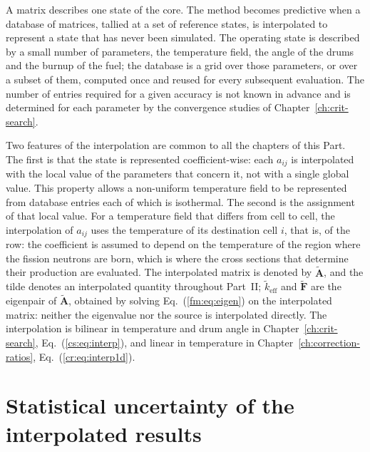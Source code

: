 A matrix describes one state of the core. The method becomes predictive when a
database of matrices, tallied at a set of reference states, is interpolated to
represent a state that has never been simulated. The operating state is described by
a small number of parameters, the temperature field, the angle of the drums and
the burnup of the fuel; the database is a grid over
those parameters, or over a subset of them, computed once and reused for every subsequent evaluation. The number of entries required for a given accuracy is not known in advance
and is determined for each parameter by the convergence studies of
Chapter~\ref{ch:crit-search}.

Two features of the interpolation are common to all the chapters of this Part. The first is that the state is represented coefficient-wise:
each $a_{ij}$ is interpolated with the local value of the parameters that
concern it, not with a single global value. This property allows a non-uniform temperature field to be represented from
database entries each of which is isothermal. The second is the assignment of that local value. For a
temperature field that differs from cell to cell, the interpolation of
$a_{ij}$ uses the temperature of its destination cell $i$, that is, of the
row: the coefficient is assumed to depend on the temperature of the region
where the fission neutrons are born, which is where the cross sections that
determine their production are evaluated. The interpolated matrix is denoted
by $\tilde{\mathbf A}$, and the tilde denotes an interpolated quantity
throughout Part~II; $\tilde k_{\mathrm{eff}}$ and $\tilde{\mathbf F}$ are the
eigenpair of $\tilde{\mathbf A}$, obtained by solving Eq.~(\ref{fm:eq:eigen})
on the interpolated matrix: neither the eigenvalue nor the source is
interpolated directly. The interpolation is bilinear in temperature and drum
angle in Chapter~\ref{ch:crit-search}, Eq.~(\ref{cs:eq:interp}), and linear in
temperature in Chapter~\ref{ch:correction-ratios}, Eq.~(\ref{cr:eq:interp1d}).

\section{Statistical uncertainty of the interpolated results}\label{fm:sec:uq}

